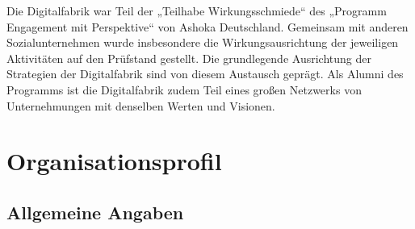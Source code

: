 \documentclass[12pt, a4paper]{article} %
\begin{document}
Die Digitalfabrik war Teil der „Teilhabe Wirkungsschmiede“ des „Programm
Engagement mit Perspektive“ von Ashoka Deutschland. Gemeinsam mit
anderen Sozialunternehmen wurde insbesondere die Wirkungsausrichtung der
jeweiligen Aktivitäten auf den Prüfstand gestellt. Die grundlegende
Ausrichtung der Strategien der Digitalfabrik sind von diesem Austausch
geprägt. Als Alumni des Programms ist die Digitalfabrik zudem Teil eines
großen Netzwerks von Unternehmungen mit denselben Werten und Visionen.

\hypertarget{organisationsprofil}{%
\section{Organisationsprofil}\label{organisationsprofil}}

\hypertarget{allgemeine-angaben}{%
\subsection{Allgemeine Angaben}\label{allgemeine-angaben}}
\end{document}
